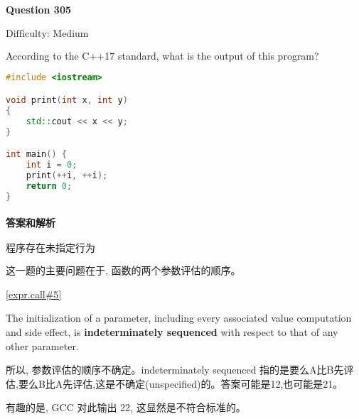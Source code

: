 \documentclass{article}
\begin{document}
	
	\paragraph*{Question 305} $\boxed{\text{Difficulty: Medium}} $			
	
	According to the C++17 standard, what is the output of this program?
	
	\begin{lstlisting}[language=C++]  		
#include <iostream>

void print(int x, int y)
{
	std::cout << x << y;
}

int main() {
	int i = 0;
	print(++i, ++i);
	return 0;
}
	\end{lstlisting}
	
	
	\paragraph*{答案和解析} $\boxed{\text{程序存在未指定行为}} $
	
	这一题的主要问题在于, 函数的两个参数评估的顺序。
	
	\href{https://timsong-cpp.github.io/cppwp/n4659/expr.call#5}{[expr.call\#5]}
	\begin{lightgrayleftbar}
		The initialization of a parameter, including every associated value computation and side effect, is \textbf{indeterminately sequenced} with respect to that of any other parameter.
	\end{lightgrayleftbar}
	
	所以, 参数评估的顺序不确定。indeterminately sequenced 指的是要么A比B先评估,要么B比A先评估,这是不确定(unspecified)的。答案可能是12,也可能是21。
	
	有趣的是, GCC 对此输出 22, 这显然是不符合标准的。
	
\end{document}
